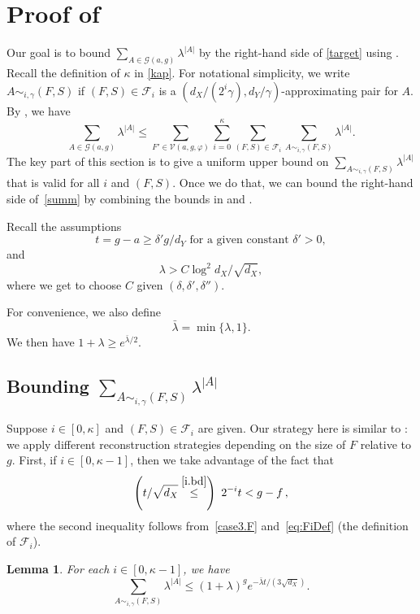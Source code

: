 \documentclass[10pt,a4paper]{amsart}
\newtheorem{lem}[thm]{Lemma}
\theoremstyle{definition}
\newcommand{\gl}{\lambda}
\newcommand{\cF}{\mathcal{F} }
\newcommand{\cG}{\mathcal{G} }
\newcommand{\cV}{\mathcal{V} }
\newcommand{\beq}[1]{\begin{equation}\label{#1}}
\newcommand{\enq}[0]{\end{equation}}
\newcommand{\gd}[0]{\delta }
\newcommand{\0}[0]{\emptyset}
\newcommand{\lam}{\lambda}
\begin{document}
\section{Proof of }\label{mlproofsec}

Our goal is to bound $\sum_{A \in \cG(a,g)} \gl^{|A|}$ by the right-hand side of \eqref{target} using . Recall the definition of $\kappa$ in \eqref{kap}. For notational simplicity, we write $A\sim_{i, \gamma}(F, S)$ if $(F,S)\in \cF_i$
is a $(d_X/(2^i\gamma),d_Y/\gamma)$-approximating pair for $A$.
By , we have
\beq{summ}\sum_{A \in \cG(a,g)} \gl^{|A|} \le \sum_{F' \in \cV(a,g,\varphi)} \sum_{i=0}^\kappa \sum_{(F,S) \in \cF_i} \sum_{A \sim_{i, \gamma} (F,S)}\gl^{|A|}.\enq
The key part of this section is to give a uniform upper bound on $\sum_{A \sim_{i, \gamma}(F,S)} \gl^{|A|}$ that is valid for all $i$ and $(F,S)$. Once we do that, we can bound the right-hand side of~\eqref{summ} by combining the bounds in  and .

Recall the assumptions
\beq{t.ass} t=g-a\ge \gd' g/d_Y \text{ for a given constant $\gd'>0$},\enq
and
\beq{gl.ass} \gl>C\log^2 d_X/\sqrt{d_X}, \enq
where we get to choose $C$ given $(\gd, \gd', \gd'')$.

For convenience, we also define
\[ \bar\lam = \min\{\lam, 1\}.\]
We then have $1+\lam\geq e^{\bar\lam/2}.$

\subsection{Bounding $\sum_{A \sim_{i, \gamma}(F,S)}\gl^{|A|}$}\label{reconstruction} Suppose $i \in [0, \kappa]$ and $(F,S) \in \cF_i$ are given. Our strategy here is similar to \cite{galvin_threshold}: we apply different reconstruction strategies depending on the size of $F$ relative to $g$. First, if $i \in [0, \kappa-1]$, then we take advantage of the fact that
\beq{2.i.bd} \left(t/\sqrt {d_X} \stackrel{\eqref{i.bd}}{\le}\right)~2^{-i}t<g-f\, , \enq
where the second inequality follows from~\eqref{case3.F} and~\eqref{eq:FiDef} (the definition of $\mathcal{F}_i$). 

\begin{lem}\label{small.F}
    For each $i \in [0, \kappa-1]$, we have
    \[\sum_{A \sim_{i, \gamma}(F,S)} \gl^{|A|} \le (1+\gl)^ge^{-\bar\gl t/(3\sqrt {d_X})}.\]
\end{lem}
\end{document}
